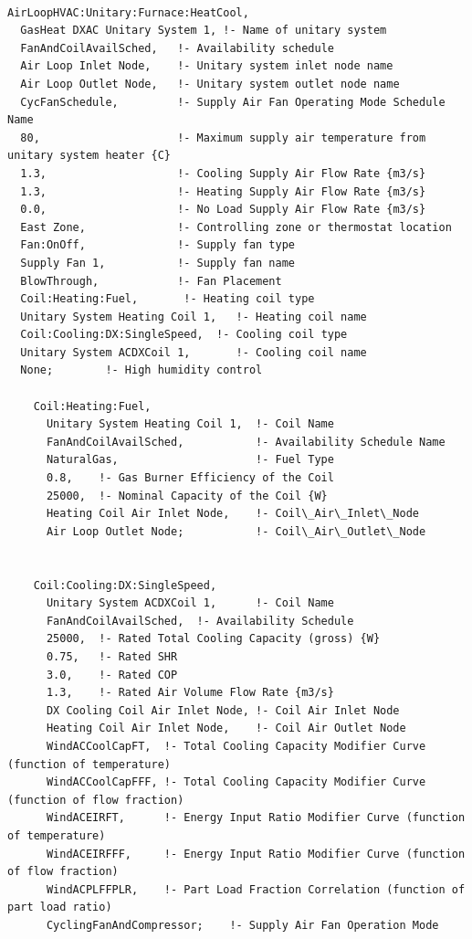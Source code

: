 \begin{lstlisting}

AirLoopHVAC:Unitary:Furnace:HeatCool,
  GasHeat DXAC Unitary System 1, !- Name of unitary system
  FanAndCoilAvailSched,   !- Availability schedule
  Air Loop Inlet Node,    !- Unitary system inlet node name
  Air Loop Outlet Node,   !- Unitary system outlet node name
  CycFanSchedule,         !- Supply Air Fan Operating Mode Schedule Name
  80,                     !- Maximum supply air temperature from unitary system heater {C}
  1.3,                    !- Cooling Supply Air Flow Rate {m3/s}
  1.3,                    !- Heating Supply Air Flow Rate {m3/s}
  0.0,                    !- No Load Supply Air Flow Rate {m3/s}
  East Zone,              !- Controlling zone or thermostat location
  Fan:OnOff,              !- Supply fan type
  Supply Fan 1,           !- Supply fan name
  BlowThrough,            !- Fan Placement
  Coil:Heating:Fuel,       !- Heating coil type
  Unitary System Heating Coil 1,   !- Heating coil name
  Coil:Cooling:DX:SingleSpeed,  !- Cooling coil type
  Unitary System ACDXCoil 1,       !- Cooling coil name
  None;        !- High humidity control

    Coil:Heating:Fuel,
      Unitary System Heating Coil 1,  !- Coil Name
      FanAndCoilAvailSched,           !- Availability Schedule Name
      NaturalGas,                     !- Fuel Type
      0.8,    !- Gas Burner Efficiency of the Coil
      25000,  !- Nominal Capacity of the Coil {W}
      Heating Coil Air Inlet Node,    !- Coil\_Air\_Inlet\_Node
      Air Loop Outlet Node;           !- Coil\_Air\_Outlet\_Node


    Coil:Cooling:DX:SingleSpeed,
      Unitary System ACDXCoil 1,      !- Coil Name
      FanAndCoilAvailSched,  !- Availability Schedule
      25000,  !- Rated Total Cooling Capacity (gross) {W}
      0.75,   !- Rated SHR
      3.0,    !- Rated COP
      1.3,    !- Rated Air Volume Flow Rate {m3/s}
      DX Cooling Coil Air Inlet Node, !- Coil Air Inlet Node
      Heating Coil Air Inlet Node,    !- Coil Air Outlet Node
      WindACCoolCapFT,  !- Total Cooling Capacity Modifier Curve (function of temperature)
      WindACCoolCapFFF, !- Total Cooling Capacity Modifier Curve (function of flow fraction)
      WindACEIRFT,      !- Energy Input Ratio Modifier Curve (function of temperature)
      WindACEIRFFF,     !- Energy Input Ratio Modifier Curve (function of flow fraction)
      WindACPLFFPLR,    !- Part Load Fraction Correlation (function of part load ratio)
      CyclingFanAndCompressor;    !- Supply Air Fan Operation Mode



\end{lstlisting}
